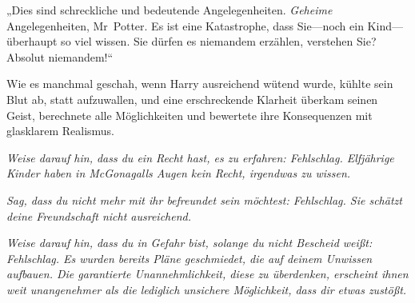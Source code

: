 „Dies sind schreckliche und bedeutende Angelegenheiten. \emph{Geheime} Angelegenheiten, Mr~Potter. Es ist eine Katastrophe, dass Sie—noch ein Kind—überhaupt so viel wissen. Sie dürfen es niemandem erzählen, verstehen Sie? Absolut niemandem!“

Wie es manchmal geschah, wenn Harry ausreichend wütend wurde, kühlte sein Blut ab, statt aufzuwallen, und eine erschreckende Klarheit überkam seinen Geist, berechnete alle Möglichkeiten und bewertete ihre Konsequenzen mit glasklarem Realismus.

\emph{Weise darauf hin, dass du ein Recht hast, es zu erfahren: Fehlschlag. Elfjährige Kinder haben in McGonagalls Augen kein Recht, irgendwas zu wissen.}

\emph{Sag, dass du nicht mehr mit ihr befreundet sein möchtest: Fehlschlag. Sie schätzt deine Freundschaft nicht ausreichend.}

\emph{Weise darauf hin, dass du in Gefahr bist, solange du nicht Bescheid weißt: Fehlschlag. Es wurden bereits Pläne geschmiedet, die auf deinem Unwissen aufbauen. Die garantierte Unannehmlichkeit, diese zu überdenken, erscheint ihnen weit unangenehmer als die lediglich \emph{unsichere} Möglichkeit, dass dir etwas zustößt.}

